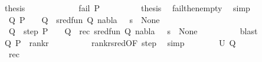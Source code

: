 \begin{isabellebody}
\ {\isacharquery}{\kern0pt}thesis\isanewline
\ \ \ \ \isamarkupfalse%
\isanewline
\ \ \ \ \ \ \isamarkupfalse%
\ {\isachardoublequoteopen}fail\ P{\isachardoublequoteclose}\isanewline
\ \ \ \ \ \ \isamarkupfalse%
\ \isamarkupfalse%
\ {\isacharquery}{\kern0pt}thesis\ \isamarkupfalse%
\ fail{\isacharunderscore}{\kern0pt}then{\isacharunderscore}{\kern0pt}empty\ \isamarkupfalse%
\ simp\isanewline
\ \ \ \ \isamarkupfalse%
\isanewline
\ \ \ \ \ \ \isamarkupfalse%
\ {\isachardoublequoteopen}{\isasymexists}{\isasymsigma}\ Q{\isachardot}{\kern0pt}\ P\ {\isasymturnstile}\ {\isasymsigma}\ {\isasymleadsto}\ Q\ {\isasymand}\ sred{\isacharunderscore}{\kern0pt}fun\ {\isacharparenleft}{\kern0pt}Q{\isacharcomma}{\kern0pt}\ nabla{\isacharcomma}{\kern0pt}\ {\isasymsigma}\ {\isasymbullet}\ s{\isacharparenright}{\kern0pt}\ {\isacharequal}{\kern0pt}\ None{\isachardoublequoteclose}\isanewline
\ \ \ \ \ \ \isamarkupfalse%
\ \isamarkupfalse%
\ {\isasymsigma}\ Q\ \ step{\isacharcolon}{\kern0pt}\ {\isachardoublequoteopen}P\ {\isasymturnstile}\ {\isasymsigma}\ {\isasymleadsto}\ Q{\isachardoublequoteclose}\ \ rec{\isacharcolon}{\kern0pt}\ {\isachardoublequoteopen}sred{\isacharunderscore}{\kern0pt}fun\ {\isacharparenleft}{\kern0pt}Q{\isacharcomma}{\kern0pt}\ nabla{\isacharcomma}{\kern0pt}\ {\isasymsigma}\ {\isasymbullet}\ s{\isacharparenright}{\kern0pt}\ {\isacharequal}{\kern0pt}\ None{\isachardoublequoteclose}\isanewline
\ \ \ \ \ \ \ \ \isamarkupfalse%
\ blast\isanewline
\ \ \ \ \ \ \isamarkupfalse%
\ {\isachardoublequoteopen}{\isacharparenleft}{\kern0pt}Q{\isacharcomma}{\kern0pt}\ P{\isacharparenright}{\kern0pt}\ {\isasymin}\ rank{\isacharunderscore}{\kern0pt}r{\isachardoublequoteclose}\isanewline
\ \ \ \ \ \ \ \ \isamarkupfalse%
\ rank{\isacharunderscore}{\kern0pt}r{\isacharunderscore}{\kern0pt}sred{\isacharbrackleft}{\kern0pt}OF\ step{\isacharbrackright}{\kern0pt}\ \isamarkupfalse%
\ simp\isanewline
\ \ \ \ \ \ \isamarkupfalse%
\ {\isachardoublequoteopen}U\ Q\ {\isacharequal}{\kern0pt}\ {\isacharbraceleft}{\kern0pt}{\isacharbraceright}{\kern0pt}{\isachardoublequoteclose}\isanewline
\ \ \ \ \ \ \ \ \isamarkupfalse%
\ {}{\isacharparenleft}{\kern0pt}{}{\isacharparenright}{\kern0pt}\ rec\ \isamarkupfalse%

\end{isabellebody}
